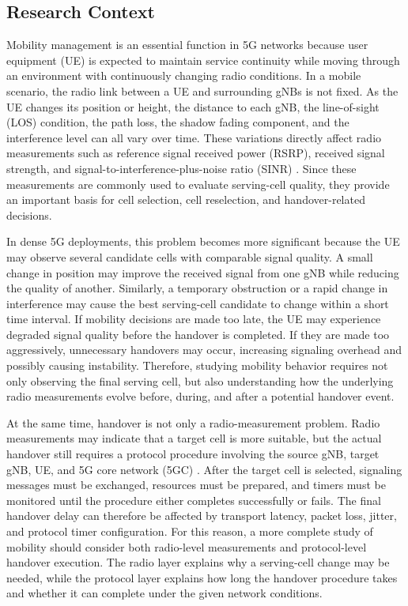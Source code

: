 \subsection{Research Context}

Mobility management is an essential function in 5G networks because user equipment (UE) is expected to maintain service continuity while moving through an environment with continuously changing radio conditions. In a mobile scenario, the radio link between a UE and surrounding gNBs is not fixed. As the UE changes its position or height, the distance to each gNB, the line-of-sight (LOS) condition, the path loss, the shadow fading component, and the interference level can all vary over time. These variations directly affect radio measurements such as reference signal received power (RSRP), received signal strength, and signal-to-interference-plus-noise ratio (SINR) \cite{3gpp_38215}. Since these measurements are commonly used to evaluate serving-cell quality, they provide an important basis for cell selection, cell reselection, and handover-related decisions.

In dense 5G deployments, this problem becomes more significant because the UE may observe several candidate cells with comparable signal quality. A small change in position may improve the received signal from one gNB while reducing the quality of another. Similarly, a temporary obstruction or a rapid change in interference may cause the best serving-cell candidate to change within a short time interval. If mobility decisions are made too late, the UE may experience degraded signal quality before the handover is completed. If they are made too aggressively, unnecessary handovers may occur, increasing signaling overhead and possibly causing instability. Therefore, studying mobility behavior requires not only observing the final serving cell, but also understanding how the underlying radio measurements evolve before, during, and after a potential handover event.

At the same time, handover is not only a radio-measurement problem. Radio measurements may indicate that a target cell is more suitable, but the actual handover still requires a protocol procedure involving the source gNB, target gNB, UE, and 5G core network (5GC) \cite{3gpp_38300}. After the target cell is selected, signaling messages must be exchanged, resources must be prepared, and timers must be monitored until the procedure either completes successfully or fails. The final handover delay can therefore be affected by transport latency, packet loss, jitter, and protocol timer configuration. For this reason, a more complete study of mobility should consider both radio-level measurements and protocol-level handover execution. The radio layer explains why a serving-cell change may be needed, while the protocol layer explains how long the handover procedure takes and whether it can complete under the given network conditions.

